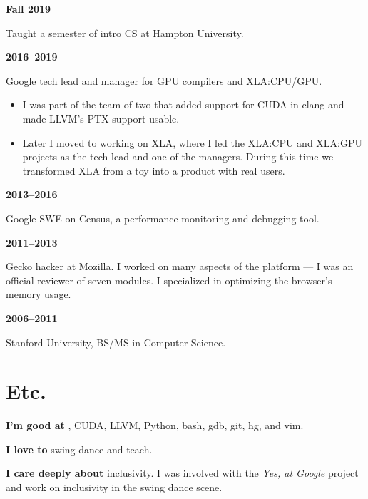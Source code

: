 \documentclass[12pt]{article}
\makeatletter
\DeclareRobustCommand{\Cpp}
{\valign{\vfil\hbox{##}\vfil\cr
   {C\kern-.05em}\cr
   $\hbox{\fontsize{\sf@size}{0}\textbf{+\kern-0.05em+}}$\cr}%
}
\makeatother
\begin{document}
\begin{minipage}{5.5em} \textbf{Fall 2019} \end{minipage}
\href{https://buildyourfuture.withgoogle.com/programs/googleinresidence}{Taught}
a semester of intro CS at Hampton University.

\begin{minipage}{5.5em} \textbf{2016--2019} \end{minipage}
Google tech lead and manager for GPU compilers and XLA:CPU/GPU.

\begin{itemize}[topsep=0.25em, itemsep=0pt, partopsep=0pt]
\item I was part of the team of two that added support for CUDA in clang and
  made LLVM's PTX support usable.

\item Later I moved to working on XLA, where I led the XLA:CPU and XLA:GPU
  projects as the tech lead and one of the managers. During this time we
  transformed XLA from a toy into a product with real users.
\end{itemize}

\begin{minipage}{5.5em} \textbf{2013--2016} \end{minipage}
Google SWE on Census, a performance-monitoring and debugging tool.

\begin{minipage}{5.5em} \textbf{2011--2013} \end{minipage}
Gecko hacker at Mozilla.  I worked on many aspects of the platform --- I was an
official reviewer of seven modules.  I specialized in optimizing the browser's
memory usage.

\begin{minipage}{5.5em} \textbf{2006--2011} \end{minipage}
Stanford University, BS/MS in Computer Science.

\section*{Etc.}
\textbf{I'm good at} \Cpp, CUDA, LLVM, Python, bash, gdb, git, hg, and vim.

\textbf{I love to} swing dance and teach.

\textbf{I care deeply about} inclusivity.  I was involved with the
\href{https://bloom.bg/2qhgDID}{\textit{Yes, at Google}} project and work on
inclusivity in the swing dance scene.
\end{document}
